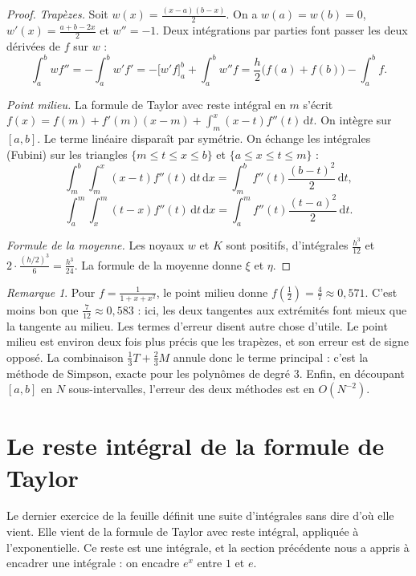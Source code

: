 \documentclass[11pt,a4paper]{article}
\theoremstyle{plain}
\theoremstyle{definition}
\theoremstyle{remark}
\newtheorem{remarque}[theoreme]{Remarque}
\newcommand{\dd}{\,\mathrm{d}}
\begin{document}
\begin{proof}
\emph{Trapèzes.} Soit $w(x)=\frac{(x-a)(b-x)}2$. On a $w(a)=w(b)=0$, $w'(x)=\frac{a+b-2x}2$ et $w''=-1$. Deux intégrations par parties font passer les deux dérivées de $f$ sur $w$ :
\[
  \int_a^bwf''=-\int_a^bw'f'=-\big[w'f\big]_a^b+\int_a^bw''f=\frac h2\big(f(a)+f(b)\big)-\int_a^bf .
\]

\emph{Point milieu.} La formule de Taylor avec reste intégral en $m$ s'écrit $f(x)=f(m)+f'(m)(x-m)+\int_m^x(x-t)f''(t)\dd t$. On intègre sur $[a,b]$. Le terme linéaire disparaît par symétrie. On échange les intégrales (Fubini) sur les triangles $\{m\leq t\leq x\leq b\}$ et $\{a\leq x\leq t\leq m\}$ :
\[
  \int_m^b\!\!\int_m^x(x-t)f''(t)\dd t\dd x=\int_m^bf''(t)\frac{(b-t)^2}2\dd t,
\]
\[
  \int_a^m\!\!\int_x^m(t-x)f''(t)\dd t\dd x=\int_a^mf''(t)\frac{(t-a)^2}2\dd t .
\]

\emph{Formule de la moyenne.} Les noyaux $w$ et $K$ sont positifs, d'intégrales $\frac{h^3}{12}$ et $2\cdot\frac{(h/2)^3}{6}=\frac{h^3}{24}$. La formule de la moyenne donne $\xi$ et $\eta$.
\end{proof}

\begin{remarque}
Pour $f=\frac1{1+x+x^2}$, le point milieu donne $f(\frac12)=\frac47\approx0{,}571$. C'est moins bon que $\frac7{12}\approx0{,}583$ : ici, les deux tangentes aux extrémités font mieux que la tangente au milieu. Les termes d'erreur disent autre chose d'utile. Le point milieu est environ deux fois plus précis que les trapèzes, et son erreur est de signe opposé. La combinaison $\frac13T+\frac23M$ annule donc le terme principal : c'est la méthode de Simpson, exacte pour les polynômes de degré $3$. Enfin, en découpant $[a,b]$ en $N$ sous-intervalles, l'erreur des deux méthodes est en $O(N^{-2})$.
\end{remarque}

\section{Le reste intégral de la formule de Taylor}

Le dernier exercice de la feuille définit une suite d'intégrales sans dire d'où elle vient. Elle vient de la formule de Taylor avec reste intégral, appliquée à l'exponentielle. Ce reste est une intégrale, et la section précédente nous a appris à encadrer une intégrale : on encadre $e^x$ entre $1$ et $e$.
\end{document}
